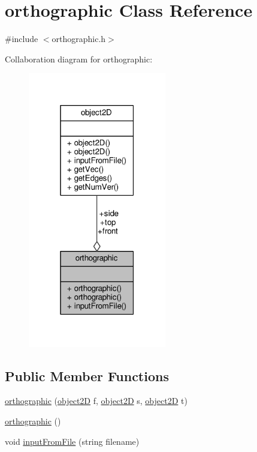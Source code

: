 \hypertarget{classorthographic}{}\section{orthographic Class Reference}
\label{classorthographic}


{\ttfamily \#include $<$orthographic.\+h$>$}



Collaboration diagram for orthographic\+:
\nopagebreak
\begin{figure}[H]
\begin{center}
\leavevmode
\includegraphics[width=171pt]{classorthographic__coll__graph}
\end{center}
\end{figure}
\subsection*{Public Member Functions}
\begin{DoxyCompactItemize}
\item 
\mbox{\hyperlink{classorthographic_a6f77ed4c0885e17bd4fbb8514338f62e}{orthographic}} (\mbox{\hyperlink{classobject2D}{object2D}} f, \mbox{\hyperlink{classobject2D}{object2D}} s, \mbox{\hyperlink{classobject2D}{object2D}} t)
\item 
\mbox{\hyperlink{classorthographic_ac461c4656ab5617ff11f091663355869}{orthographic}} ()
\item 
void \mbox{\hyperlink{classorthographic_a0d8e45328b99b53d243bffc5f5d795b6}{input\+From\+File}} (string filename)
\end{DoxyCompactItemize}
